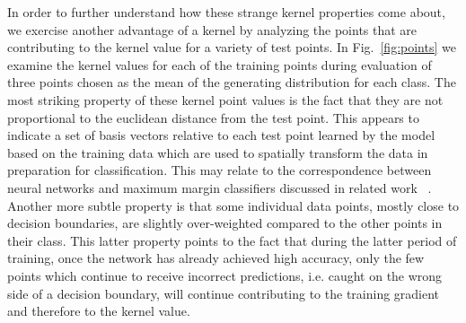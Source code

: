 In order to further understand how these strange kernel properties come about, we exercise another advantage of a kernel by analyzing the points that are contributing to the kernel value for a variety of test points. 
In Fig.~\ref{fig:points} we examine the kernel values for each of the training points during evaluation of three points chosen as the mean of the generating distribution for each class. 
The most striking property of these kernel point values is the fact that they are not proportional to the euclidean distance from the test point.
This appears to indicate a set of basis vectors relative to each test point learned by the model based on the training data which are used to spatially transform the data in preparation for classification. This may relate to the correspondence between neural networks and maximum margin classifiers discussed in related work ~\citep{chizat2020maxmargin, shah2021input}. 
Another more subtle property is that some individual data points, mostly close to decision boundaries, are slightly over-weighted compared to the other points in their class. 
This latter property points to the fact that during the latter period of training, once the network has already achieved high accuracy, only the few points which continue to receive incorrect predictions, i.e. caught on the wrong side of a decision boundary, will continue contributing to the training gradient and therefore to the kernel value.

